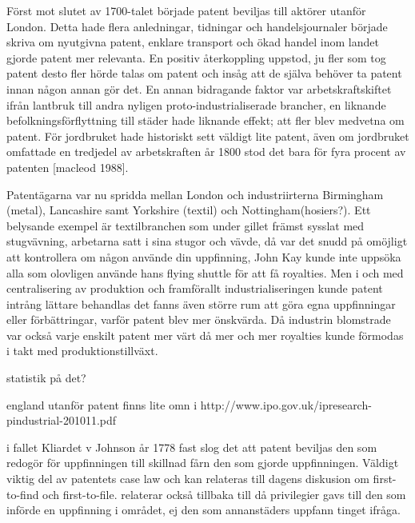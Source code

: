 Först mot slutet av 1700-talet började patent beviljas till aktörer utanför London. Detta hade flera anledningar, tidningar och handelsjournaler började skriva om nyutgivna patent, enklare transport och ökad handel inom landet gjorde patent mer relevanta. En positiv återkoppling uppstod, ju fler som tog patent desto fler hörde talas om patent och insåg att de själva behöver ta patent innan någon annan gör det. En annan bidragande faktor var arbetskraftskiftet ifrån lantbruk till andra nyligen proto-industrialiserade brancher, en liknande befolkningsförflyttning till städer hade liknande effekt; att fler blev medvetna om patent. För jordbruket hade historiskt sett väldigt lite patent, även om jordbruket omfattade en tredjedel av arbetskraften år 1800 stod det bara för fyra procent av patenten [macleod 1988].

Patentägarna var nu spridda mellan London och industriirterna Birmingham (metal), Lancashire samt Yorkshire (textil) och Nottingham(hosiers?). Ett belysande exempel är textilbranchen som under gillet främst sysslat med stugvävning, arbetarna satt i sina stugor och vävde, då var det snudd på omöjligt att kontrollera om någon använde din uppfinning, John Kay kunde inte uppsöka alla som olovligen använde hans flying shuttle för att få royalties. Men i och med centralisering av produktion och framförallt industrialiseringen kunde patent intrång lättare behandlas det fanns även större rum att göra egna uppfinningar eller förbättringar, varför patent blev mer önskvärda. Då industrin blomstrade var också varje enskilt patent mer värt då mer och mer royalties kunde förmodas i takt med produktionstillväxt.

statistik på det? 

england utanför patent finns lite omn i http://www.ipo.gov.uk/ipresearch-pindustrial-201011.pdf

i fallet Kliardet v Johnson år 1778 fast slog det att patent beviljas den som redogör för uppfinningen till skillnad fårn den som gjorde uppfinningen. Väldigt viktig del av patentets case law och kan relateras till dagens diskusion om first-to-find och first-to-file. relaterar också tillbaka till då privilegier gavs till den som införde en uppfinning i området, ej den som annanstäders uppfann tinget ifråga.


